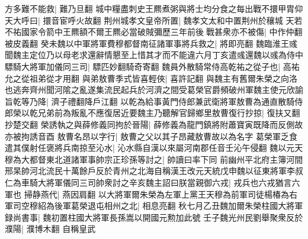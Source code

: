 方多難不能救|{
	難乃旦翻}
城中糧盡刺史王羆煮粥與將士均分食之每出戰不擐甲胄仰天大呼曰|{
	擐音宦呼火故翻}
荆州城孝文皇帝所置|{
	魏孝文太和中置荆州於穰城}
天若不祐國家令箭中王羆額不爾王羆必當破賊彌歷三年前後戰甚衆亦不被傷|{
	中作仲翻被皮義翻}
癸未魏以中軍將軍費穆都督南征諸軍事將兵救之|{
	將即亮翻}
魏臨淮王彧聞魏主定位乃以母老求還辭情懇至上惜其才而不能違六月丁亥遣彧還魏以彧為侍中驃騎大將軍加儀同三司|{
	驃匹妙翻騎奇寄翻}
魏員外散騎常侍高乾祐之從子也|{
	高祐允之從祖弟從才用翻}
與弟敖曹季式皆喜輕俠|{
	喜許記翻}
與魏主有舊爾朱榮之向洛也逃奔齊州聞河隂之亂遂集流民起兵於河濟之間受葛榮官爵頻破州軍魏主使元欣諭旨乾等乃降|{
	濟子禮翻降戶江翻}
以乾為給事黃門侍郎兼武衛將軍敖曹為通直散騎侍郎榮以乾兄弟前為叛亂不應復居近要魏主乃聽解官歸鄉里敖曹復行抄掠|{
	復扶又翻抄楚交翻}
榮誘執之與薛修義同拘於晉陽|{
	薛修義為龍門鎮將附蕭寶寅既降而反側故亦被拘誘音酉}
敖曹名昂以字行|{
	敖曹之父以其子昂藏敖曹故以為名字}
葛榮軍乏食遣其僕射任褒將兵南掠至沁水|{
	沁水縣自漢以來屬河南郡任音壬沁午侵翻}
魏以元天穆為大都督東北道諸軍事帥宗正珍孫等討之|{
	帥讀曰率下同}
前幽州平北府主簿河間邢杲帥河北流民十萬餘戶反於青州之北海自稱漢王改元天統戊申魏以征東將軍李叔仁為車騎大將軍儀同三司帥衆討之辛亥魏主詔曰朕當親御六戎|{
	戎兵也六戎猶言六軍也}
掃静燕代|{
	燕因肩翻}
以大將軍爾朱榮為左軍上黨王天穆為前軍司徒楊椿為右軍司空穆紹為後軍葛榮退屯相州之北|{
	相息亮翻}
秋七月乙丑魏加爾朱榮柱國大將軍録尚書事|{
	魏初置柱國大將軍長孫嵩以開國元勲加此號}
壬子魏光州民劉舉聚衆反於濮陽|{
	濮博木翻}
自稱皇武

